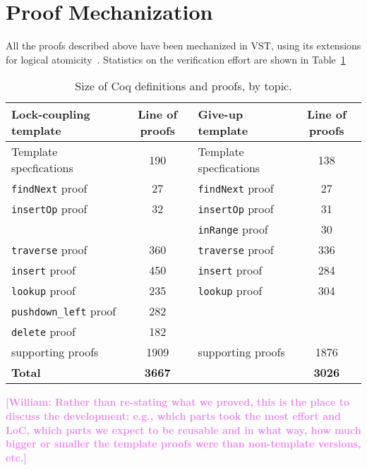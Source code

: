 \documentclass[a4paper,UKenglish,cleveref, autoref, thm-restate]{lipics-v2021}
\newcommand{\wm}[1]{\textbf{\textcolor{violet}{[William: #1]}}}
\begin{document}
\section{Proof Mechanization}
\label{proof_mech}
All the proofs described above have been mechanized in VST, using its extensions for logical atomicity~\cite{iris-vst-arxiv}. Statistics on the verification effort are shown in Table~\ref{table_coq}

\begin{table}[h]
	\begin{center}
		\begin{tabular}{l | c || l | c } 
			\hline
			\textbf{Lock-coupling template} & \textbf{Line of proofs} & \textbf{Give-up  template} & \textbf{Line of proofs} \\
			\hline
			Template specfications & 190 & Template specfications & 138 \\
			\texttt{findNext} proof 	& 27  & \texttt{findNext} proof & 27 \\
			\texttt{insertOp} proof 	& 32  & \texttt{insertOp} proof & 31 \\
			& & \texttt{inRange} proof & 30 \\
			\texttt{traverse} proof	& 360  & \texttt{traverse} proof & 336 \\ 
			\texttt{insert} proof 	   		& 450  & \texttt{insert} proof & 284 \\
			\texttt{lookup} proof 	   	& 235  &  \texttt{lookup} proof & 304 \\ 
			\texttt{pushdown\_left} proof 	   	& 282 & & \\	
			\texttt{delete} proof 		& 182	 &   & 	 \\
			supporting proofs    & 	1909	 & supporting proofs 	& 1876 \\
			\hline
			\textbf{Total} & \textbf{3667} & & \textbf{3026}  
		\end{tabular}
		\caption{Size of Coq definitions and proofs, by topic.}
		\label{table_coq}
	\end{center}
\end{table}

\wm{Rather than re-stating what we proved, this is the place to discuss the development: e.g., which parts took the most effort and LoC, which parts we expect to be reusable and in what way, how much bigger or smaller the template proofs were than non-template versions, etc.}
\end{document}

